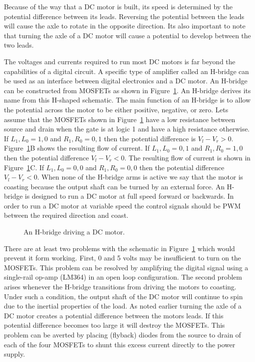 Because of the way that a DC motor is built, its speed is determined
by the potential difference between its leads.  Reversing the
potential between the leads will cause the axle to rotate 
in the opposite direction.  Its also
important to note that turning the axle of a DC motor will
cause a potential to develop between the two leads.

The voltages and currents required to run most DC motors is
far beyond the capabilities of a digital circuit.  A specific 
type of amplifier called an H-bridge can be used as an interface 
between digital electronics and a DC motor.  An H-bridge can be
constructed from MOSFETs as shown in 
Figure~\ref{fig:commonPeripheralComponentshbridge}.  An H-bridge derives its name from
this  H-shaped schematic.  The main function of an H-bridge is 
to allow the potential across the motor to be either positive,
negative, or zero.  Lets assume that the MOSFETs shown in 
Figure~\ref{fig:commonPeripheralComponentshbridge} have a low resistance between source and
drain when the gate is at logic 1 and have a high resistance 
otherwise.  If $L_1,L_0 = 1,0$ and $R_1,R_0 = 0,1$ then the
potential difference is $V_l - V_r > 0$.
Figure~\ref{fig:commonPeripheralComponentshbridge}B shows the resulting flow of current.
If $L_1,L_0 = 0,1$ and $R_1,R_0 = 1,0$ then the
potential difference $V_l - V_r < 0$.  The resulting flow of
current is shown in Figure~\ref{fig:commonPeripheralComponentshbridge}C.
If $L_1,L_0 = 0,0$ and $R_1,R_0 = 0,0$ then the potential difference 
$V_l - V_r < 0$. When none of the H-bridge arms is active we say that
the motor is coasting because the output shaft 
can be turned by an external force.  An H-bridge is designed 
to run a DC motor at full speed forward or backwards.  In order 
to run a DC motor at variable speed the control signals should be PWM 
between the required direction and coast.

\begin{figure}[ht]
\caption{An H-bridge driving a DC motor.}
\label{fig:commonPeripheralComponentshbridge}
\end{figure}

There are at least two problems with the schematic in
Figure~\ref{fig:commonPeripheralComponentshbridge} which would prevent it form working.
First, 0 and 5 volts may be insufficient to turn on the MOSFETs.
This problem can be resolved by amplifying the digital signal
using a single-rail op-amp (LM364) in an open loop configuration.
The second problem arises whenever the H-bridge transitions
from driving the motors to coasting.  Under such a condition, the
output shaft of the DC motor will continue to spin due to the
inertial properties of the load.  As noted earlier turning the
axle of a DC motor creates a potential difference between the 
motors leads.  If this potential difference becomes too
large it will destroy the MOSFETs.
This problem can be averted by placing (flyback) diodes from the 
source to drain of each of the four MOSFETs to shunt this excess 
current directly to the power supply.

